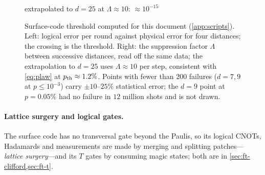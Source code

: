 \begin{figure}[H]
\begin{minipage}[b]{0.34\textwidth}
extrapolated to $d=25$ at $\Lambda\approx10$: $\approx10^{-15}$\\[6pt]
\end{minipage}
\caption{Surface-code threshold computed for this document (\cref{app:scripts}). Left: logical error per round against physical error for four distances; the crossing is the threshold. Right: the suppression factor $\Lambda$ between successive distances, read off the same data; the extrapolation to $d=25$ uses $\Lambda\approx10$ per step, consistent with \cref{eq:plaw} at $p_{\rm th}\approx1.2\%$. Points with fewer than $200$ failures ($d=7,9$ at $p\le10^{-3}$) carry $\pm10$--$25\%$ statistical error; the $d=9$ point at $p=0.05\%$ had no failure in $12$ million shots and is not drawn.}
\label{fig:threshold}
\end{figure}

\paragraph{Lattice surgery and logical gates.} The surface code has no transversal gate beyond the Paulis, so its logical CNOTs, Hadamards and measurements are made by merging and splitting patches---\emph{lattice surgery}---and its $T$ gates by consuming magic states; both are in \cref{sec:ft-clifford,sec:ft-t}.

